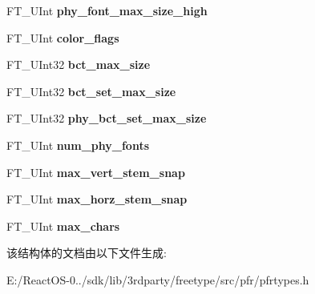\begin{DoxyCompactItemize}
\item 
\mbox{\label{struct_p_f_r___header_rec___a9686e272a39dce6a1690f201537256cc}} 
F\+T\+\_\+\+U\+Int {\bfseries phy\+\_\+font\+\_\+max\+\_\+size\+\_\+high}
\item 
\mbox{\label{struct_p_f_r___header_rec___a7c420c3bed3c4afc484409ad6e5088c8}} 
F\+T\+\_\+\+U\+Int {\bfseries color\+\_\+flags}
\item 
\mbox{\label{struct_p_f_r___header_rec___a68cedb26e058ed3f665bd17b9adb4926}} 
F\+T\+\_\+\+U\+Int32 {\bfseries bct\+\_\+max\+\_\+size}
\item 
\mbox{\label{struct_p_f_r___header_rec___ab836e08af6229ff3378e7037253aad7c}} 
F\+T\+\_\+\+U\+Int32 {\bfseries bct\+\_\+set\+\_\+max\+\_\+size}
\item 
\mbox{\label{struct_p_f_r___header_rec___ae5453ab1e9bf09e69944e70b363ae30e}} 
F\+T\+\_\+\+U\+Int32 {\bfseries phy\+\_\+bct\+\_\+set\+\_\+max\+\_\+size}
\item 
\mbox{\label{struct_p_f_r___header_rec___a3c9731b17a6ae185bb11a77bf9f6f1b1}} 
F\+T\+\_\+\+U\+Int {\bfseries num\+\_\+phy\+\_\+fonts}
\item 
\mbox{\label{struct_p_f_r___header_rec___a097711d27ae03f3420fb1f398beefa69}} 
F\+T\+\_\+\+U\+Int {\bfseries max\+\_\+vert\+\_\+stem\+\_\+snap}
\item 
\mbox{\label{struct_p_f_r___header_rec___a12e630ec7b2eee29da74296c0a096ad2}} 
F\+T\+\_\+\+U\+Int {\bfseries max\+\_\+horz\+\_\+stem\+\_\+snap}
\item 
\mbox{\label{struct_p_f_r___header_rec___a6ce19a8c69848414003f324b501e0688}} 
F\+T\+\_\+\+U\+Int {\bfseries max\+\_\+chars}
\end{DoxyCompactItemize}


该结构体的文档由以下文件生成\+:\begin{DoxyCompactItemize}
\item 
E\+:/\+React\+O\+S-\/0../sdk/lib/3rdparty/freetype/src/pfr/pfrtypes.\+h\end{DoxyCompactItemize}
